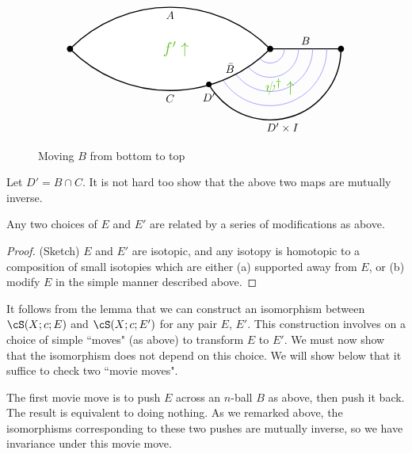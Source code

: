\begin{figure}[t]
\begin{equation*}
\begin{tikzpicture}[baseline,line width = 1pt,x=1.5cm,y=-1.5cm]
\draw (0,0) node(R) {}
	-- (0.75,0) node[above] {$B$}
	--(1.5,0)  node[circle,fill=black,inner sep=2pt] {}
	arc (0:80:1.5) node[below] {$D' \times I$}
	arc (80:180:1.5);
\foreach \r in {0.3, 0.6, 0.9, 1.2} {
	\draw[blue!50, line width = 0.5pt] (\r,0) arc (0:180:\r);
}
\draw[fill=white]
	(R) node[circle,fill=black,inner sep=2pt] {}
	arc (45:65:3) node[above] {$\bar{B}$}
	arc (65:90:3) node[below] {$C$}
	arc (90:135:3) node[circle,fill=black,inner sep=2pt] {}
	arc (-135:-90:3) node[below] {$A$}
	arc (-90:-45:3);
\draw[fill]  (150:1.5) circle (2pt) node[below=4pt] {$D'$};
\node[green!50!brown] at (-2,0) {\scalebox{1.4}{$f'\uparrow $}};
\node[green!50!brown] at (0.2,0.8) {\scalebox{1.4}{$\psi^\dagger \uparrow $}};
\end{tikzpicture}
\end{equation*}
\caption{Moving $B$ from bottom to top}
\label{jun23c}
\end{figure}
Let $D' = B\cap C$.
It is not hard too show that the above two maps are mutually inverse.

\begin{lem} \label{equator-lemma}
Any two choices of $E$ and $E'$ are related by a series of modifications as above.
\end{lem}

\begin{proof}
(Sketch)
$E$ and $E'$ are isotopic, and any isotopy is 
homotopic to a composition of small isotopies which are either
(a) supported away from $E$, or (b) modify $E$ in the simple manner described above.
\end{proof}

It follows from the lemma that we can construct an isomorphism
between $\cS(X; c; E)$ and $\cS(X; c; E')$ for any pair $E$, $E'$.
This construction involves on a choice of simple ``moves" (as above) to transform
$E$ to $E'$.
We must now show that the isomorphism does not depend on this choice.
We will show below that it suffice to check two ``movie moves".

The first movie move is to push $E$ across an $n$-ball $B$ as above, then push it back.
The result is equivalent to doing nothing.
As we remarked above, the isomorphisms corresponding to these two pushes are mutually
inverse, so we have invariance under this movie move.

